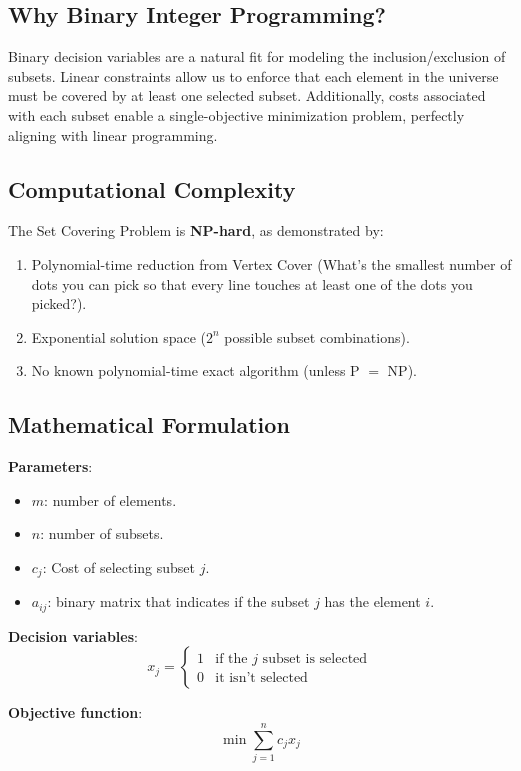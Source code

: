 \documentclass[11pt,letterpaper]{article}
\begin{document}
\subsection*{Why Binary Integer Programming?}
Binary decision variables are a natural fit for modeling the inclusion/exclusion of subsets. Linear constraints allow us to enforce that each element in the universe must be covered by at least one selected subset. Additionally, costs associated with each subset enable a single-objective minimization problem, perfectly aligning with linear programming. \cite{balas1972}

\subsection*{Computational Complexity}
The Set Covering Problem is \textbf{NP-hard}, as demonstrated by:
\begin{enumerate}
    \item Polynomial-time reduction from Vertex Cover (What’s the smallest number of dots you can pick so that every line touches at least one of the dots you picked?)\cite{karp1972reducibility}.
    \item Exponential solution space ($2^n$ possible subset combinations).
    \item No known polynomial-time exact algorithm (unless P $=$ NP).
\end{enumerate}

\subsection*{Mathematical Formulation}
\textbf{Parameters}:
\begin{itemize}
    \item $m$: number of elements.
    \item $n$: number of subsets.
    \item $c_j$: Cost of selecting subset $j$.
    \item $a_{ij}$: binary matrix that indicates if the subset $j$ has the element $i$.
\end{itemize}

\textbf{Decision variables}:
\[
x_j = \begin{cases}
1 & \text{if the $j$ subset is selected} \\
0 & \text{it isn't selected}
\end{cases}
\]

\textbf{Objective function}:
\[
\min \sum_{j=1}^{n} c_j x_j
\]
\end{document}
